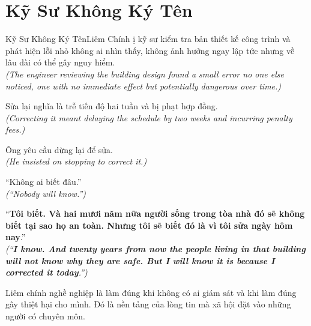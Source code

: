 \section{Kỹ Sư Không Ký Tên}
\begin{truyen}{Kỹ Sư Không Ký Tên}{Liêm Chính}
ị kỹ sư kiểm tra bản thiết kế công trình và phát hiện lỗi nhỏ không ai nhìn thấy, không ảnh hưởng ngay lập tức nhưng về lâu dài có thể gây nguy hiểm.\\
\textit{(The engineer reviewing the building design found a small error no one else noticed, one with no immediate effect but potentially dangerous over time.)}

Sửa lại nghĩa là trễ tiến độ hai tuần và bị phạt hợp đồng.\\
\textit{(Correcting it meant delaying the schedule by two weeks and incurring penalty fees.)}

Ông yêu cầu dừng lại để sửa.\\
\textit{(He insisted on stopping to correct it.)}

``Không ai biết đâu.''\\
\textit{(``Nobody will know.'')}

``\textbf{Tôi biết. Và hai mươi năm nữa người sống trong tòa nhà đó sẽ không biết tại sao họ an toàn. Nhưng tôi sẽ biết đó là vì tôi sửa ngày hôm nay}.''\\
\textit{(``\textbf{I know. And twenty years from now the people living in that building will not know why they are safe. But I will know it is because I corrected it today}.'')}
\end{truyen}
\begin{baihoc}
  Liêm chính nghề nghiệp là làm đúng khi không có ai giám sát và khi làm đúng gây thiệt hại cho mình. Đó là nền tảng của lòng tin mà xã hội đặt vào những người có chuyên môn.
\end{baihoc}

